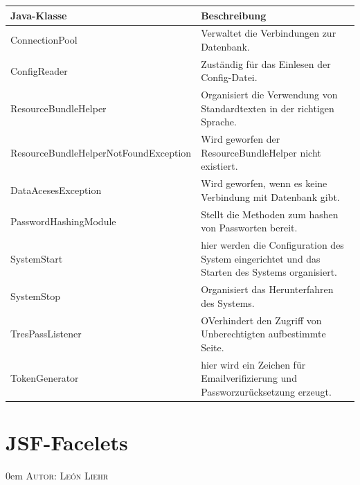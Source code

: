 \documentclass{article}
\makeatletter
\newcommand{\sectionauthor}[1]{
	{\parindent 0em \large \scshape Autor: #1 \par \nobreak \vspace*{1em}}
	\@afterheading
}
\makeatother
\begin{document}
  \begin{center}
    \begin{table}
        \begin{tabular} { |p{}|p{}| }
              \hline
            Java-Klasse & Beschreibung  \\
           \hline\hline
            ConnectionPool & Verwaltet die Verbindungen zur Datenbank. \\
            \hline
            ConfigReader& Zuständig  für das Einlesen der Config-Datei. \\
             \hline
            ResourceBundleHelper & Organisiert die Verwendung von Standardtexten in
            der richtigen Sprache.\\

            \hline ResourceBundleHelperNotFoundException & Wird geworfen der ResourceBundleHelper nicht existiert. \\
             \hline
            DataAcesesException & Wird geworfen,  wenn es keine Verbindung mit Datenbank gibt. \\
            \hline
            PasswordHashingModule & Stellt die Methoden zum hashen  von Passworten bereit.\\
            \hline
            SystemStart & hier werden die Configuration des System eingerichtet und das Starten des Systems organisiert.\\
            \hline
            SystemStop & Organisiert das Herunterfahren des Systems.\\
             \hline
            TresPassListener & OVerhindert den Zugriff von Unberechtigten aufbestimmte Seite.\\
            \hline
            TokenGenerator & hier wird ein Zeichen für Emailverifizierung und Passworzurücksetzung erzeugt.\\
           \hline
        \end{tabular}
        \end{table}
        \end{center}








\section{JSF-Facelets}
\sectionauthor{León Liehr}
\end{document}

